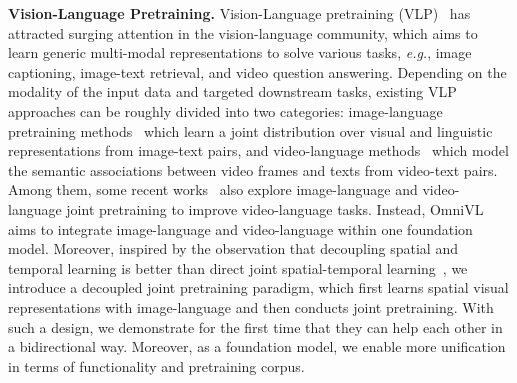 \documentclass{article}
\makeatletter
\newcommand*{\system}{OmniVL\@\xspace}
\newcommand*{\eg}{\emph{e.g.}\@\xspace}
\makeatother
\begin{document}
\noindent \textbf{Vision-Language Pretraining.} Vision-Language pretraining (VLP)~\cite{lu2019vilbert,tan2019lxmert,sun2019videobert,chen2020uniter,Su2020VL-BERT,radford2021learning,jia2021scaling,jia2021exploring} has attracted surging attention in the vision-language community, which aims to learn generic multi-modal representations to solve various tasks, \eg, image captioning, image-text retrieval, and video question answering. Depending on the modality of the input data and targeted downstream tasks, existing VLP approaches can be roughly divided into two categories: image-language pretraining methods~\cite{chen2020uniter,li2020oscar,zhou2020unified,wang2022simvlm} which learn a joint distribution over visual and linguistic representations from image-text pairs, and video-language methods~\cite{li2020hero,lei2021less,li2021prompt,fu2021violet,bain2021frozen,miech2020end,alayrac2020self,akbari2021vatt,patrick2020support} which model the semantic associations between video frames and texts from video-text pairs. Among them, some recent works~\cite{bain2021frozen,fu2021violet} also explore image-language and video-language joint pretraining to improve video-language tasks. Instead,  \system aims to integrate image-language and video-language within one foundation model. Moreover, inspired by the observation that decoupling spatial and temporal learning is better than direct joint spatial-temporal learning~\cite{wang2022bevt,zhang2021cotraining}, we introduce a decoupled joint pretraining paradigm, which first learns spatial visual representations with image-language and then conducts joint pretraining. With such a design, we demonstrate for the first time that they can help each other in a bidirectional way. Moreover, as a foundation model, we enable more unification in terms of functionality and pretraining corpus.   
\end{document}
